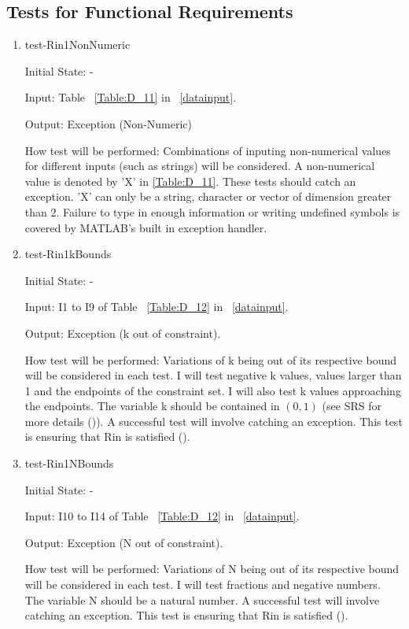 \documentclass[12pt, titlepage]{article}
\begin{document}
\subsection{Tests for Functional Requirements}
\label{FRtests}
\begin{enumerate}
\item{test-Rin1NonNumeric\\}	
				
Initial State: -
					
Input: Table ~\ref{Table:D_11} in ~\ref{datainput}.
					
Output: Exception (Non-Numeric)
					
How test will be performed: Combinations of inputing non-numerical values for 
different 
inputs  (such as strings) will be considered. A non-numerical value is denoted 
by 'X' in \ref{Table:D_11}. These tests should catch an exception. 'X' can 
only be a string, character or vector of dimension greater than 2. Failure to 
type in enough information or writing undefined symbols is covered by MATLAB's 
built in exception handler.\\

\item{test-Rin1kBounds\\}	

Initial State: -

Input: I1 to I9 of Table ~\ref{Table:D_12} in ~\ref{datainput}.

Output: Exception (k out of constraint).

How test will be performed: Variations of k being out of its respective bound 
will be considered in each test. I will test negative k values, values larger 
than 1 and the endpoints of the constraint set. I will also test k values 
approaching the endpoints. The variable k should be contained in $(0,1)$ (see 
SRS for more details (\cite{SRS})). A successful test will involve catching 
an exception. This test is ensuring that Rin is satisfied (\cite{SRS}).\\ 

\item{test-Rin1NBounds\\}	

Initial State: -

Input: I10 to I14 of Table ~\ref{Table:D_12} in ~\ref{datainput}.

Output: Exception (N out of constraint).

How test will be performed: Variations of N being out of its respective bound 
will be considered in each test. I will test fractions and negative numbers. 
The variable N should be a natural number. A successful test will involve 
catching an exception. This test is ensuring that Rin is satisfied 
(\cite{SRS}). \\  


\end{enumerate}
\end{document}
